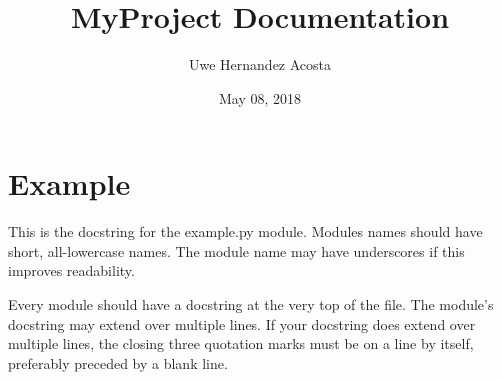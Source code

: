 \documentclass[letterpaper,10pt,english]{sphinxmanual}
\title{MyProject Documentation}
\date{May 08, 2018}
\author{Uwe Hernandez Acosta}
\begin{document}
\maketitle
\sphinxtableofcontents
{}\label{\detokenize{example::doc}}



\chapter{Example}
\label{\detokenize{example:example}}\label{\detokenize{example:welcome-to-myproject-s-documentation}}\label{\detokenize{example:module-example.example}}
This is the docstring for the example.py module.  Modules names should
have short, all-lowercase names.  The module name may have underscores if
this improves readability.

Every module should have a docstring at the very top of the file.  The
module’s docstring may extend over multiple lines.  If your docstring does
extend over multiple lines, the closing three quotation marks must be on
a line by itself, preferably preceded by a blank line.
\end{document}

